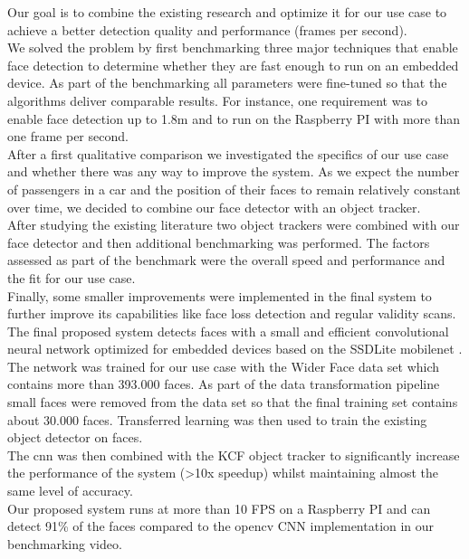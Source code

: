 Our goal is to combine the existing research and optimize it for our use case to achieve a better detection quality and performance (frames per second).\\
We solved the problem by first benchmarking three major techniques that enable face detection to determine whether they are fast enough to run on an embedded device. As part of the benchmarking all parameters were fine-tuned so that the algorithms deliver comparable results. For instance, one requirement was to enable face detection up to 1.8m and to run on the Raspberry PI with more than one frame per second.\\
After a first qualitative comparison we investigated the specifics of our use case and whether there was any way to improve the system. As we expect the number of passengers in a car and the position of their faces to remain relatively constant over time, we decided to combine our face detector with an object tracker.\\
After studying the existing literature two object trackers were combined with our face detector and then additional benchmarking was performed. The factors assessed as part of the benchmark were the overall speed and performance and the fit for our use case.\\
Finally, some smaller improvements were implemented in the final system to further improve its capabilities like face loss detection and regular validity scans.\\
The final proposed system detects faces with a small and efficient convolutional neural network optimized for embedded devices based on the SSDLite \gls{mobilenet} \cite{mobilenet}. The network was trained for our use case with the Wider Face \cite{widerface} data set which contains more than 393.000 faces. As part of the data transformation pipeline small faces were removed from the data set so that the final training set contains about 30.000 faces. Transferred learning was then used to train the existing object detector on faces. \\
The \gls{cnn} was then combined with the KCF object tracker to significantly increase the performance of the system (>10x speedup) whilst maintaining almost the same level of accuracy.\\
Our proposed system runs at more than 10 FPS on a Raspberry PI and can detect 91\% of the faces compared to the \gls{opencv} CNN implementation in our benchmarking video.\\
